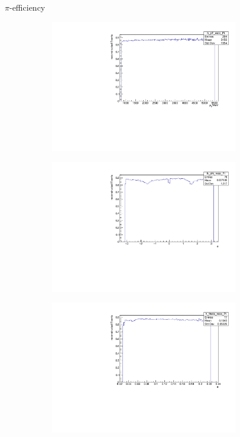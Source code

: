 \documentclass[11pt]{beamer}
\begin{document}
\begin{frame}{$\pi$-efficiency}
\begin{figure}
\begin{subfigure}{0.45\textwidth}
\includegraphics[width=0.9\textwidth]{up_pdf/h_pt_reco_Pi.pdf}
\end{subfigure}
\begin{subfigure}{0.45\textwidth}
\includegraphics[width=0.9\textwidth]{up_pdf/h_phi_reco_Pi.pdf}
\end{subfigure}
\begin{subfigure}{0.45\textwidth}
\includegraphics[width=0.9\textwidth]{up_pdf/h_theta_reco_Pi.pdf}

\end{subfigure}
\end{figure}
\end{frame}
\end{document}
